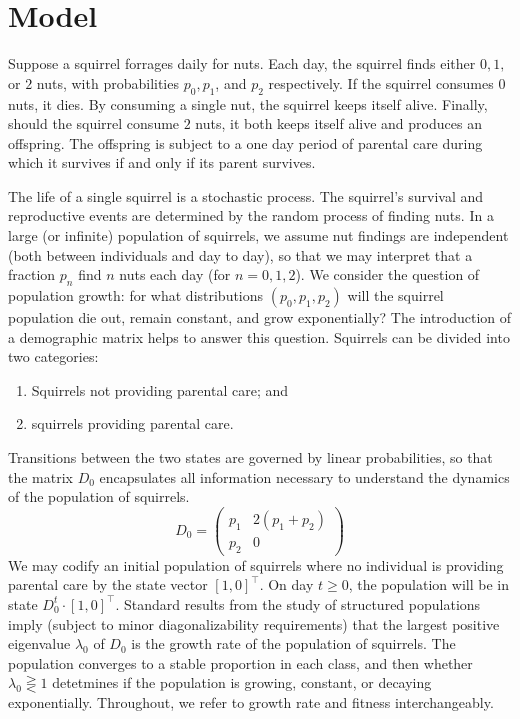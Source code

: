 \documentclass[titlepage, hidelinks, 12pt]{article}
\theoremstyle{plain}
\theoremstyle{remark}
\theoremstyle{definition}
\begin{document}
\section{Model}
Suppose a squirrel forrages daily for nuts. Each day, the squirrel finds either $0, 1,$ or $2$ nuts, with probabilities $p_0, p_1$, and $p_2$
respectively. If the squirrel consumes $0$ nuts, it dies. By consuming a single nut, the squirrel keeps itself alive. Finally, should the squirrel
consume $2$ nuts, it both keeps itself alive and produces an offspring. The offspring is subject to a one day period of parental care during
which it survives if and only if its parent survives. 

The life of a single squirrel is a stochastic process. The squirrel's survival and reproductive events are determined by the random process of
finding nuts. In a large (or infinite) population of squirrels, we assume nut findings are independent (both between individuals and day to day),
so that we may interpret that a fraction $p_n$ find $n$ nuts each day (for $n=0,1,2$). We consider the question of population growth: for what distributions 
$(p_0, p_1, p_2)$ will the squirrel population die out, remain constant, and grow exponentially? The introduction of a demographic matrix
helps to answer this question. Squirrels can be divided into two categories:
\begin{enumerate}
    \item Squirrels not providing parental care; and
    \item squirrels providing parental care.
\end{enumerate}

Transitions between the two states are governed by linear probabilities, so that the matrix $D_0$ encapsulates
all information necessary to understand the dynamics of the population of squirrels.
\begin{equation}
D_0 =
\begin{pmatrix}
    p_1 & 2(p_1 + p_2) \\ p_2 & 0
\end{pmatrix}
    \label{eqn:D0}
\end{equation}
We may codify an initial population of squirrels where no individual is providing parental care by the state vector $\left[ 1, 0 \right]^\intercal$. 
On day $t\ge 0$, the population will be in state $D_0^t\cdot \left[1, 0\right]^\intercal$. Standard results from the study of structured populations
imply (subject to minor diagonalizability requirements) that the largest positive eigenvalue $\lambda_0$ of $D_0$ is the growth 
rate of the population of squirrels. The population converges to a stable proportion in each class, and then whether $\lambda_0\gtreqless 1$ 
detetmines if the population is growing, constant, or decaying exponentially. Throughout, we refer to growth rate and fitness interchangeably. 
\end{document}
